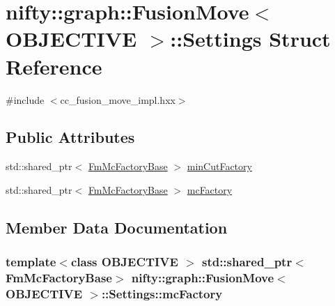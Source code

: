 \hypertarget{structnifty_1_1graph_1_1FusionMove_1_1Settings}{}\section{nifty\+:\+:graph\+:\+:Fusion\+Move$<$ O\+B\+J\+E\+C\+T\+I\+V\+E $>$\+:\+:Settings Struct Reference}
\label{structnifty_1_1graph_1_1FusionMove_1_1Settings}


{\ttfamily \#include $<$cc\+\_\+fusion\+\_\+move\+\_\+impl.\+hxx$>$}

\subsection*{Public Attributes}
\begin{DoxyCompactItemize}
\item 
std\+::shared\+\_\+ptr$<$ \hyperlink{classnifty_1_1graph_1_1FusionMove_a75c5190f6b01321efa3f23cb10b2dd36}{Fm\+Mc\+Factory\+Base} $>$ \hyperlink{structnifty_1_1graph_1_1FusionMove_1_1Settings_a81df1add11545812ae40ede234c75ebd}{min\+Cut\+Factory}
\item 
std\+::shared\+\_\+ptr$<$ \hyperlink{classnifty_1_1graph_1_1FusionMove_a75c5190f6b01321efa3f23cb10b2dd36}{Fm\+Mc\+Factory\+Base} $>$ \hyperlink{structnifty_1_1graph_1_1FusionMove_1_1Settings_a9fe3968521c5c5a0e7e8b3bd46767d3a}{mc\+Factory}
\end{DoxyCompactItemize}


\subsection{Member Data Documentation}
\hypertarget{structnifty_1_1graph_1_1FusionMove_1_1Settings_a9fe3968521c5c5a0e7e8b3bd46767d3a}{}
\subsubsection[{mc\+Factory}]{\setlength{\rightskip}{0pt plus 5cm}template$<$class O\+B\+J\+E\+C\+T\+I\+V\+E $>$ std\+::shared\+\_\+ptr$<${\bf Fm\+Mc\+Factory\+Base}$>$ {\bf nifty\+::graph\+::\+Fusion\+Move}$<$ O\+B\+J\+E\+C\+T\+I\+V\+E $>$\+::Settings\+::mc\+Factory}\label{structnifty_1_1graph_1_1FusionMove_1_1Settings_a9fe3968521c5c5a0e7e8b3bd46767d3a}
\hypertarget{structnifty_1_1graph_1_1FusionMove_1_1Settings_a81df1add11545812ae40ede234c75ebd}{}
